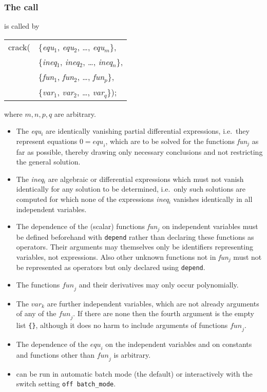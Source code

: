\subsubsection{The call}
 is called by
\begin{center}
  \begin{tabular}{r@{}l}\ttfamily
    crack( & \{\textit{equ}$_1$, \textit{equ}$_2$, \ldots , \textit{equ}$_m$\}, \\
    & \{\textit{ineq}$_1$, \textit{ineq}$_2$, \ldots , \textit{ineq}$_n$\}, \\
    & \{\textit{fun}$_1$, \textit{fun}$_2$, \ldots , \textit{fun}$_p$\}, \\
    & \{\textit{var}$_1$, \textit{var}$_2$, \ldots , \textit{var}$_q$\});
  \end{tabular}
\end{center}
where $m,n,p,q$ are arbitrary.
\begin{itemize}
\item The \textit{equ}$_i$ are identically vanishing partial
  differential expressions, i.e.\ they represent equations $0 =
  \mathit{equ}_i$, which are to be solved for the functions
  \textit{fun}$_j$ as far as possible, thereby drawing only necessary
  conclusions and not restricting the general solution.
\item The \textit{ineq}$_i$ are algebraic or differential expressions
  which must not vanish identically for any solution to be determined,
  i.e.\ only such solutions are computed for which none of the
  expressions \textit{ineq}$_i$ vanishes identically in all
  independent variables.
\item The dependence of the (scalar) functions \textit{fun}$_j$ on
  independent variables must be defined beforehand with
  \texttt{depend} rather than declaring these functions as operators.
  Their arguments may themselves only be identifiers representing
  variables, not expressions.  Also other unknown functions not in
  \textit{fun}$_j$ must not be represented as operators but only
  declared using \texttt{depend}.
\item The functions $\textit{fun}_j$ and their derivatives may only
  occur polynomially.
\item The $\textit{var}_k$ are further independent variables, which
  are not already arguments of any of the $\textit{fun}_j$.  If there
  are none then the fourth argument is the empty list \texttt{\{\}},
  although it does no harm to include arguments of functions
  $\textit{fun}_j$.
\item The dependence of the $\textit{equ}_i$ on the independent
  variables and on constants and functions other than $\textit{fun}_j$
  is arbitrary.
\item {} can be run in automatic batch mode (the default)
  or interactively with the switch setting \texttt{off batch\_mode}.
\end{itemize}

